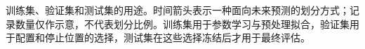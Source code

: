 训练集、验证集和测试集的用途。时间箭头表示一种面向未来预测的划分方式；记录数量仅作示意，不代表划分比例。训练集用于参数学习与预处理拟合，验证集用于配置和停止位置的选择，测试集在这些选择冻结后才用于最终评估。
